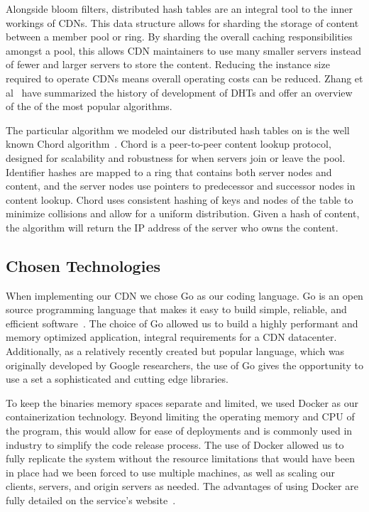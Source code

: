 \documentclass[conference]{IEEEtran}
\begin{document}
Alongside bloom filters, distributed hash tables are an integral tool to the inner workings of CDNs.  This data structure allows for sharding the storage of content between a member pool or ring.  By sharding the overall caching responsibilities amongst a pool, this allows CDN maintainers to use many smaller servers instead of fewer and larger servers to store the content.  Reducing the instance size required to operate CDNs means overall operating costs can be reduced. Zhang et al~\cite{ZhangDHT} have summarized the history of development of DHTs and offer an overview of the of the most popular algorithms. 

The particular algorithm we modeled our distributed hash tables on is the well known Chord algorithm~\cite{StoicaChord}. Chord is a peer-to-peer content lookup protocol, designed for scalability and robustness for when servers join or leave the pool. Identifier hashes are mapped to a ring that contains both server nodes and content, and the server nodes use pointers to predecessor and successor nodes in content lookup. Chord uses consistent hashing of keys and nodes of the table to minimize collisions and allow for a uniform distribution. Given a hash of content, the algorithm will return the IP address of the server who owns the content. 

\subsection*{Chosen Technologies}
When implementing our CDN we chose Go as our coding language.  Go is an open source programming language that makes it easy to build simple, reliable, and efficient software~\cite{go}.  The choice of Go allowed us to build a highly performant and memory optimized application, integral requirements for a CDN datacenter. Additionally, as a relatively recently created but popular language, which was originally developed by Google researchers, the use of Go gives the opportunity to use a set a sophisticated and cutting edge libraries.

To keep the binaries memory spaces separate and limited, we used Docker as our containerization technology.  Beyond limiting the operating memory and CPU of the program, this would allow for ease of deployments and is commonly used in industry to simplify the code release process. The use of Docker allowed us to fully replicate the system without the resource limitations that would have been in place had we been forced to use multiple machines, as well as scaling our clients, servers, and origin servers as needed. The advantages of using Docker are fully detailed on the service’s website~\cite{docker}. 
\end{document}
